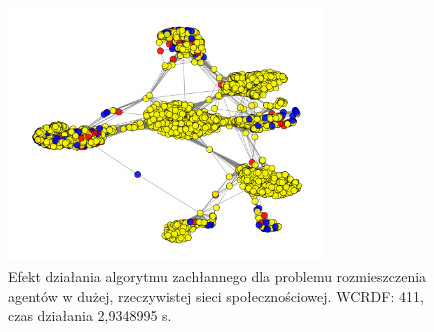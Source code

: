 \begin{figure}[H]
    \centering
    \includegraphics[width=0.75\textwidth]{assets/Facebook/facebookgreedy.png}
    \caption{Efekt działania algorytmu zachłannego dla problemu rozmieszczenia agentów w dużej, rzeczywistej sieci społecznościowej. WCRDF: 411, czas działania 2,9348995 s.}
    \label{fig:fbgreedy}
\end{figure}